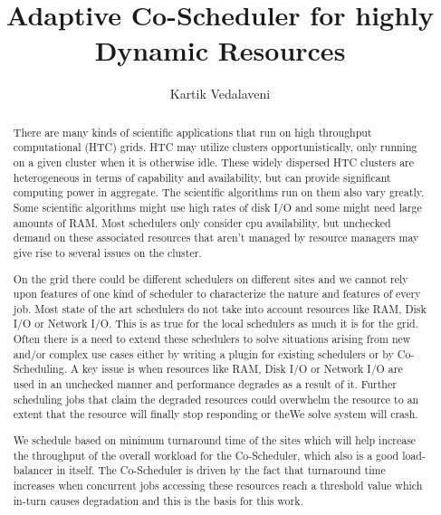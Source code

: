 \documentclass[ms,electronic,double]{nuthesis}
\begin{document}
\frontmatter
\title{Adaptive Co-Scheduler for highly Dynamic Resources}
\author{Kartik Vedalaveni}
\maketitle

\begin{abstract}
 There are many kinds of scientific applications that run on high throughput computational (HTC) 
grids. HTC may utilize clusters opportunistically, only running on a given cluster 
when it is otherwise idle. These widely dispersed HTC clusters are heterogeneous in terms of 
capability and availability, but can provide significant computing power in aggregate. The scientific 
algorithms run on them also vary greatly. Some scientific algorithms might use high rates of disk I/O 
and some might need large amounts of RAM. Most schedulers only consider cpu availability, but 
unchecked demand on these associated resources that aren't managed by resource managers 
may give rise to several issues on the cluster.

On the grid there could be different schedulers on different sites and we cannot rely upon features 
of one kind of scheduler to characterize the nature and features of every job. Most state of the art 
schedulers do not take into account resources like RAM, Disk I/O or Network I/O. This is as true for the
 local schedulers as much it is for the grid. Often there is a need to extend these schedulers to solve 
 situations arising from new and/or complex use cases either by writing a plugin for existing schedulers or by Co­Scheduling. 
 A key issue is when resources like RAM, Disk I/O or Network I/O are used in an unchecked manner and 
 performance degrades as a result of it. Further scheduling jobs that claim the degraded resources could 
 overwhelm the resource to an extent that the resource will finally stop responding or theWe solve system will crash. 
 
 We schedule based on minimum turnaround time of the sites which will help increase 
the throughput of the overall workload for the Co-Scheduler, which also is a good load-balancer in itself. 
The Co-Scheduler is driven by the fact that turnaround time increases when 
concurrent jobs accessing these resources reach a threshold value which in-turn causes 
degradation and this is the basis for this work.


\end{abstract}
\end{document}
